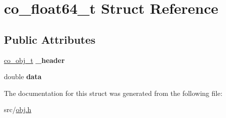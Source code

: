 \hypertarget{structco__float64__t}{\section{co\-\_\-float64\-\_\-t Struct Reference}
\label{structco__float64__t}
}
\subsection*{Public Attributes}
\begin{DoxyCompactItemize}
\item 
\hypertarget{structco__float64__t_a9d9c92206ce5bfb92d84d978996de06e}{\hyperlink{structco__obj__t}{co\-\_\-obj\-\_\-t} {\bfseries \-\_\-header}}\label{structco__float64__t_a9d9c92206ce5bfb92d84d978996de06e}

\item 
\hypertarget{structco__float64__t_ad4638a94649f7986b5d9d2428e6641c4}{double {\bfseries data}}\label{structco__float64__t_ad4638a94649f7986b5d9d2428e6641c4}

\end{DoxyCompactItemize}


The documentation for this struct was generated from the following file\-:\begin{DoxyCompactItemize}
\item 
src/\hyperlink{obj_8h}{obj.\-h}\end{DoxyCompactItemize}
